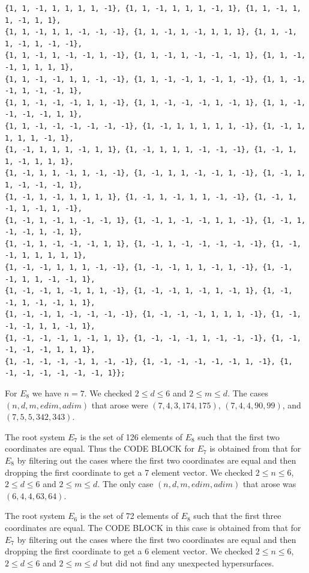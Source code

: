 \documentclass[12pt]{amsart}
\numberwithin{equation}{section}
\theoremstyle{definition}
\begin{document}
{\begin{verbatim}
{1, 1, -1, 1, 1, 1, 1, -1}, {1, 1, -1, 1, 1, 1, -1, 1}, {1, 1, -1, 1, 1, -1, 1, 1}, 
{1, 1, -1, 1, 1, -1, -1, -1}, {1, 1, -1, 1, -1, 1, 1, 1}, {1, 1, -1, 1, -1, 1, -1, -1}, 
{1, 1, -1, 1, -1, -1, 1, -1}, {1, 1, -1, 1, -1, -1, -1, 1}, {1, 1, -1, -1, 1, 1, 1, 1}, 
{1, 1, -1, -1, 1, 1, -1, -1}, {1, 1, -1, -1, 1, -1, 1, -1}, {1, 1, -1, -1, 1, -1, -1, 1}, 
{1, 1, -1, -1, -1, 1, 1, -1}, {1, 1, -1, -1, -1, 1, -1, 1}, {1, 1, -1, -1, -1, -1, 1, 1}, 
{1, 1, -1, -1, -1, -1, -1, -1}, {1, -1, 1, 1, 1, 1, 1, -1}, {1, -1, 1, 1, 1, 1, -1, 1}, 
{1, -1, 1, 1, 1, -1, 1, 1}, {1, -1, 1, 1, 1, -1, -1, -1}, {1, -1, 1, 1, -1, 1, 1, 1}, 
{1, -1, 1, 1, -1, 1, -1, -1}, {1, -1, 1, 1, -1, -1, 1, -1}, {1, -1, 1, 1, -1, -1, -1, 1}, 
{1, -1, 1, -1, 1, 1, 1, 1}, {1, -1, 1, -1, 1, 1, -1, -1}, {1, -1, 1, -1, 1, -1, 1, -1}, 
{1, -1, 1, -1, 1, -1, -1, 1}, {1, -1, 1, -1, -1, 1, 1, -1}, {1, -1, 1, -1, -1, 1, -1, 1}, 
{1, -1, 1, -1, -1, -1, 1, 1}, {1, -1, 1, -1, -1, -1, -1, -1}, {1, -1, -1, 1, 1, 1, 1, 1}, 
{1, -1, -1, 1, 1, 1, -1, -1}, {1, -1, -1, 1, 1, -1, 1, -1}, {1, -1, -1, 1, 1, -1, -1, 1}, 
{1, -1, -1, 1, -1, 1, 1, -1}, {1, -1, -1, 1, -1, 1, -1, 1}, {1, -1, -1, 1, -1, -1, 1, 1}, 
{1, -1, -1, 1, -1, -1, -1, -1}, {1, -1, -1, -1, 1, 1, 1, -1}, {1, -1, -1, -1, 1, 1, -1, 1}, 
{1, -1, -1, -1, 1, -1, 1, 1}, {1, -1, -1, -1, 1, -1, -1, -1}, {1, -1, -1, -1, -1, 1, 1, 1}, 
{1, -1, -1, -1, -1, 1, -1, -1}, {1, -1, -1, -1, -1, -1, 1, -1}, {1, -1, -1, -1, -1, -1, -1, 1}};
\end{verbatim}
}

For $E_8$ we have $n=7$. 
We checked $2\leq d\leq 6$ and $2\leq m\leq d$. The cases $({n, d, m, edim, adim})$ 
that arose were
$({7, 4, 3, 174, 175})$,
$({7, 4, 4, 90, 99})$, and
$({7, 5, 5, 342, 343})$.

The root system $E_7$ is the set of 126 elements of $E_8$ such that the first two coordinates are equal.
Thus the CODE BLOCK for $E_7$ is obtained from that for $E_8$ by filtering out the cases where
the first two coordinates are equal and then dropping the first coordinate to get a 7 element vector.
We checked $2\leq n\leq6$, $2\leq d\leq 6$ and $2\leq m\leq d$. The only case $(n, d, m, edim, adim)$ 
that arose was $({6, 4, 4, 63, 64})$.

The root system $E_6$ is the set of 72 elements of $E_8$ such that the first three coordinates are equal.
The CODE BLOCK in this case is obtained from that for $E_7$ by filtering out the cases where
the first two coordinates are equal and then dropping the first coordinate to get a 6 element vector.
We checked $2\leq n\leq6$, $2\leq d\leq 6$ and $2\leq m\leq d$ but did not find any 
unexpected hypersurfaces.
\end{document}
